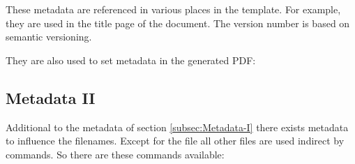 These metadata are referenced in various places in the template. For example,
they are used in the title page of the document. The version number is based
on semantic versioning.


They are also used to set metadata in the generated PDF:


\subsection{Metadata II}
\label{subsec:Metadata-II}

Additional to the metadata of section \ref{subsec:Metadata-I} there exists
metadata to influence the filenames. Except for the 
file all other files are used indirect by commands. So there are these
commands available:

